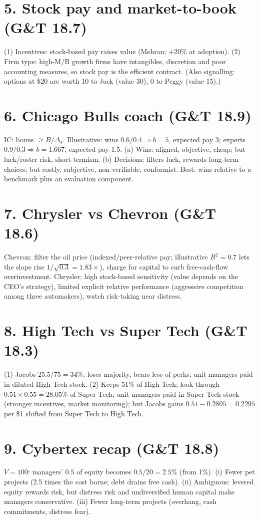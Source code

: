 \documentclass[11pt,a4paper]{article}
\begin{document}
\section*{5. Stock pay and market-to-book (G\&T 18.7)}
(1) Incentives: stock-based pay raises value (Mehran; +20\% at adoption). (2) Firm type: high-M/B growth
firms have intangibles, discretion and poor accounting measures, so stock pay is the efficient contract.
(Also signalling: options at \$20 are worth 10 to Jack (value 30), 0 to Peggy (value 15).)

\section*{6. Chicago Bulls coach (G\&T 18.9)}
IC: bonus $\ge B/\Delta_s$. Illustrative: wins $0.6/0.4\Rightarrow b=5$, expected pay 3; experts $0.9/0.3\Rightarrow
b=1.667$, expected pay 1.5. (a) Wins: aligned, objective, cheap; but luck/roster risk, short-termism.
(b) Decisions: filters luck, rewards long-term choices; but costly, subjective, non-verifiable,
conformist. Best: wins relative to a benchmark plus an evaluation component.

\section*{7. Chrysler vs Chevron (G\&T 18.6)}
Chevron: filter the oil price (indexed/peer-relative pay; illustrative $R^2=0.7$ lets the slope rise
$1/\sqrt{0.3}=1.83\times$), charge for capital to curb free-cash-flow overinvestment. Chrysler: high
stock-based sensitivity (value depends on the CEO's strategy), limited explicit relative performance
(aggressive competition among three automakers), watch risk-taking near distress.

\section*{8. High Tech vs Super Tech (G\&T 18.3)}
(1) Jacobs $25.5/75=34\%$: loses majority, bears less of perks; unit managers paid in diluted High Tech
stock. (2) Keeps 51\% of High Tech; look-through $0.51\times0.55=28.05\%$ of Super Tech; unit managers paid
in Super Tech stock (stronger incentives, market monitoring); but Jacobs gains $0.51-0.2805=0.2295$ per
\$1 shifted from Super Tech to High Tech.

\section*{9. Cybertex recap (G\&T 18.8)}
$V=100$: managers' $0.5$ of equity becomes $0.5/20=2.5\%$ (from 1\%). (i) Fewer pet projects (2.5 times
the cost borne; debt drains free cash). (ii) Ambiguous: levered equity rewards risk, but distress risk and
undiversified human capital make managers conservative. (iii) Fewer long-term projects (overhang,
cash commitments, distress fear).
\end{document}
